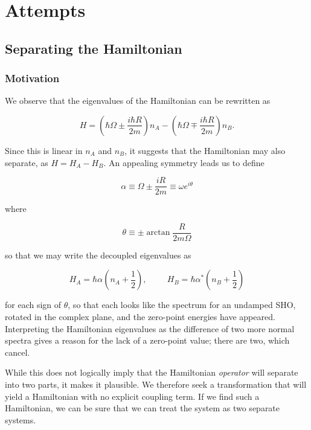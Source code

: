 \newpage
\chapter{Attempts}

\section{Separating the Hamiltonian}

\subsection{Motivation}

We observe that the eigenvalues of the Hamiltonian can be rewritten as

\begin{equation}
H = (\hbar \Omega \pm \frac{i \hbar R}{2 m}) n_{A} -
    (\hbar \Omega \mp \frac{i \hbar R}{2 m}) n_{B}.
\end{equation}

Since this is linear in $n_{A}$ and $n_{B}$, it suggests that the Hamiltonian
may also separate, as $H = H_{A} - H_{B}$.  An appealing symmetry leads us
to define

\begin{equation}
\alpha \equiv \Omega \pm \frac{i R}{2 m} \equiv \omega e^{i \theta}
\end{equation}

where

\begin{equation}
\theta \equiv \pm \arctan \frac{R}{2 m \Omega}
\end{equation}

so that we may write the decoupled eigenvalues as

\begin{equation}
H_{A} = \hbar \alpha (n_{A} + \frac{1}{2}), \hspace{1cm}
	H_{B} = \hbar \alpha^{*} (n_{B} + \frac{1}{2})
\end{equation}

for each sign of $\theta$,
so that each looks like the spectrum for an undamped SHO, rotated in the
complex plane, and the zero-point energies have appeared.  Interpreting the
Hamiltonian eigenvalues as the difference of two more normal spectra gives
a reason for the lack of a zero-point value; there are two, which cancel.

While this does not logically imply that the Hamiltonian {\em operator} will
separate into two parts, it makes it plausible.  We therefore seek a 
transformation that will yield a Hamiltonian with no explicit coupling term.
If we find such a Hamiltonian, we can be sure that we can treat the system
as two separate systems.

